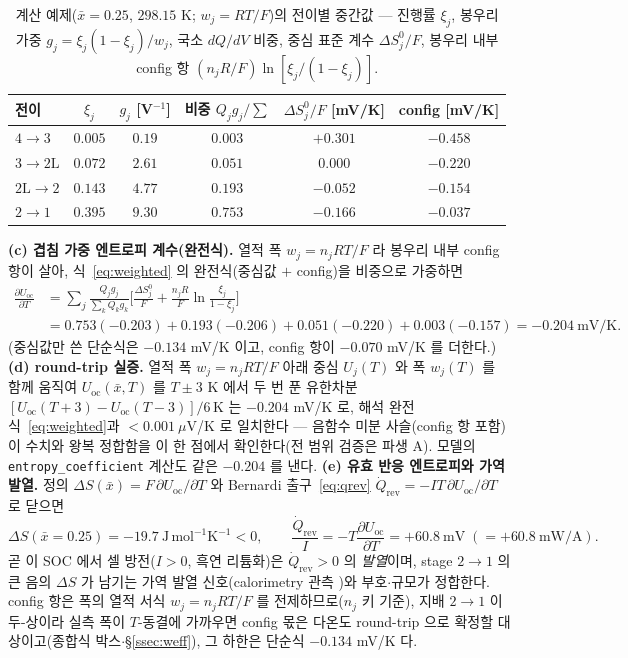 \documentclass[11pt,a4paper]{article}
\newcommand{\rev}{\mathrm{rev}}
\newcommand{\oc}{\mathrm{oc}}
\begin{document}
\begin{table}[htbp]
\centering\small
\renewcommand{\arraystretch}{1.2}
\caption{계산 예제($\bar x{=}0.25$, $298.15$ K; $w_j{=}RT/F$)의 전이별 중간값 — 진행률 $\xi_j$, 봉우리 가중
$g_j=\xi_j(1-\xi_j)/w_j$, 국소 $dQ/dV$ 비중, 중심 표준 계수 $\Delta S^0_j/F$, 봉우리 내부 config 항 $(n_jR/F)\ln[\xi_j/(1-\xi_j)]$.}
\label{tab:worked}
\begin{tabular}{lccccc}
\toprule
전이 & $\xi_j$ & $g_j$ [V$^{-1}$] & 비중 $Q_jg_j/\!\sum$ & $\Delta S^0_j/F$ [mV/K] & config [mV/K] \\
\midrule
$4\!\to\!3$   & $0.005$ & $0.19$ & $0.003$ & $+0.301$ & $-0.458$ \\
$3\!\to\!2\mathrm L$ & $0.072$ & $2.61$ & $0.051$ & $0.000$ & $-0.220$ \\
$2\mathrm L\!\to\!2$ & $0.143$ & $4.77$ & $0.193$ & $-0.052$ & $-0.154$ \\
$2\!\to\!1$   & $0.395$ & $9.30$ & $0.753$ & $-0.166$ & $-0.037$ \\
\bottomrule
\end{tabular}
\end{table}
\textbf{(c) 겹침 가중 엔트로피 계수(완전식).} 열적 폭 $w_j{=}n_jRT/F$ 라 봉우리 내부 config 항이 살아,
식~\eqref{eq:weighted} 의 완전식(중심값 $+$ config)을 비중으로 가중하면
\begin{equation*}
\begin{aligned}
\frac{\partial U_\oc}{\partial T}
&=\sum_j\frac{Q_jg_j}{\sum_kQ_kg_k}\Big[\frac{\Delta S^0_j}{F}+\frac{n_jR}{F}\ln\frac{\xi_j}{1-\xi_j}\Big]\\
&=0.753(-0.203)+0.193(-0.206)+0.051(-0.220)+0.003(-0.157)
=-0.204\ \mathrm{mV/K}.
\end{aligned}
\end{equation*}
(중심값만 쓴 단순식은 $-0.134$ mV/K 이고, config 항이 $-0.070$ mV/K 를 더한다.)
\textbf{(d) round-trip 실증.} 열적 폭 $w_j{=}n_jRT/F$ 아래 중심 $U_j(T)$ 와 폭 $w_j(T)$ 를 함께 움직여
$U_\oc(\bar x,T)$ 를 $T\pm3$ K 에서 두 번 푼 유한차분 $[U_\oc(T{+}3)-U_\oc(T{-}3)]/6\,\mathrm K$ 는 $-0.204$ mV/K 로,
해석 완전식~\eqref{eq:weighted}과 $<\!0.001\ \mu$V/K 로 일치한다 --- 음함수 미분 사슬(config 항 포함)이 수치와
왕복 정합함을 이 한 점에서 확인한다(전 범위 검증은 파생 A). 모델의 \texttt{entropy\_coefficient} 계산도 같은 $-0.204$ 를 낸다. \textbf{(e) 유효 반응 엔트로피와 가역 발열.} 정의 $\Delta S(\bar x)=F\,\partial U_\oc/\partial T$ 와
Bernardi 출구~\eqref{eq:qrev} $\dot Q_\rev=-IT\,\partial U_\oc/\partial T$ 로 닫으면
\begin{equation*}
\Delta S(\bar x{=}0.25)=-19.7\ \mathrm{J\,mol^{-1}K^{-1}}<0,
\qquad
\frac{\dot Q_\rev}{I}=-T\frac{\partial U_\oc}{\partial T}=+60.8\ \mathrm{mV}\;(=+60.8\ \mathrm{mW/A}).
\end{equation*}
곧 이 SOC 에서 셀 방전($I>0$, 흑연 리튬화)은 $\dot Q_\rev>0$ 의 \emph{발열}이며, stage $2\!\to\!1$ 의 큰 음의
$\Delta S$ 가 남기는 가역 발열 신호(calorimetry 관측 \cite{standardised2024})와 부호$\cdot$규모가 정합한다.
config 항은 폭의 열적 서식 $w_j{=}n_jRT/F$ 를 전제하므로($n_j$ 키 기준), 지배 $2\!\to\!1$ 이 두-상이라 실측 폭이
$T$-동결에 가까우면 config 몫은 다온도 round-trip 으로 확정할 대상이고(종합식 박스$\cdot$\S\ref{ssec:weff}),
그 하한은 단순식 $-0.134$ mV/K 다.
\end{document}
